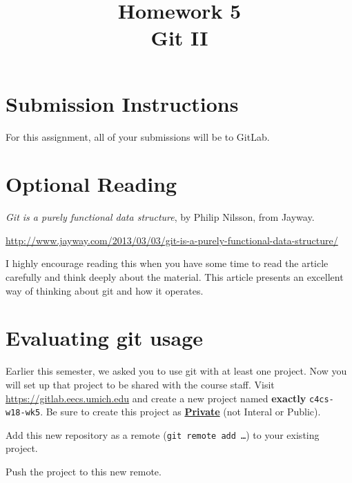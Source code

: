 \documentclass{article}
\begin{document}
\fancyhead[L]{}
\fancyhead[R]{}

\fancyfoot[C]{\color{gray} \thepage~/~\pageref*{LastPage}}
\pagestyle{fancyplain}

\title{\textbf{Homework 5\\Git II}}
\author{\textbf{\color{red}{Due: Wednesday, February 14th, 11:59PM (Hard Deadline)}}}
\date{}
\maketitle


\section*{Submission Instructions}
For this assignment, all of your submissions will be to GitLab.


\section*{Optional Reading}

\emph{Git is a purely functional data structure}, by Philip Nilsson, from Jayway.

\url{http://www.jayway.com/2013/03/03/git-is-a-purely-functional-data-structure/}

I highly encourage reading this when you have some time to read the article
carefully and think deeply about the material.
This article presents an excellent way of thinking about git and how it
operates.



\section{Evaluating git usage}

Earlier this semester, we asked you to use git with at least one project. Now
you will set up that project to be shared with the course staff. Visit
\url{https://gitlab.eecs.umich.edu} and create a new project named
\textbf{exactly} \texttt{c4cs-w18-wk5}.
Be sure to create this project as
\textbf{\ul{Private}} (not Interal or Public).

Add this new repository as a remote (\texttt{git remote add \dots}) to your
existing project.

Push the project to this new remote.
\end{document}
